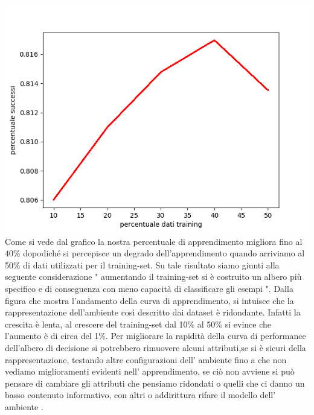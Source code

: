 		\includegraphics[scale=0.86]{performance.png}
		Come si vede dal grafico la nostra percentuale di apprendimento migliora fino al 40\% dopodiché si percepisce un degrado dell'apprendimento quando arriviamo al 50\% di dati utilizzati per il training-set.
		\newline
		 Su tale risultato siamo giunti alla seguente considerazione " aumentando il training-set si è costruito un albero più specifico e di conseguenza  con meno capacità di classificare gli esempi ".
		 Dalla figura che mostra l'andamento della curva di apprendimento, si intuisce che la rappresentazione dell'ambiente così descritto dai dataset è ridondante.
		  Infatti la crescita è lenta, al crescere del training-set dal 10\% al 50\% si evince che l'aumento è di circa del 1\%.
		  Per migliorare la rapidità della curva di performance dell'albero di decisione si potrebbero rimuovere alcuni attributi,se si è sicuri della rappresentazione, testando altre configurazioni dell' ambiente fino a che non vediamo miglioramenti evidenti nell' apprendimento, se ciò non avviene si può pensare di cambiare gli attributi che pensiamo ridondati o quelli che ci danno un basso contenuto informativo, con altri o addirittura rifare il modello dell' ambiente . 
		\subsection{}
		
